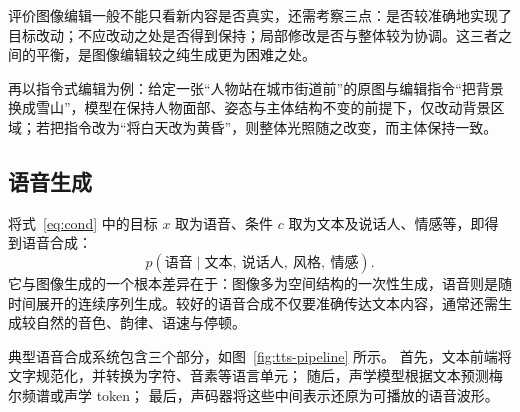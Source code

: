 \begin{importantnote}
  评价图像编辑一般不能只看新内容是否真实，还需考察三点：是否较准确地实现了目标改动；不应改动之处是否得到保持；局部修改是否与整体较为协调。这三者之间的平衡，是图像编辑较之纯生成更为困难之处。
\end{importantnote}

再以指令式编辑为例：给定一张“人物站在城市街道前”的原图与编辑指令“把背景换成雪山”，模型在保持人物面部、姿态与主体结构不变的前提下，仅改动背景区域；若把指令改为“将白天改为黄昏”，则整体光照随之改变，而主体保持一致。

\subsection{语音生成}
\label{sub:tts}

将式~\eqref{eq:cond} 中的目标 $x$ 取为语音、条件 $c$ 取为文本及说话人、情感等，即得到语音合成：
\begin{equation}
  p(\text{语音}\mid \text{文本},\ \text{说话人},\ \text{风格},\ \text{情感}).
\end{equation}
它与图像生成的一个根本差异在于：图像多为空间结构的一次性生成，语音则是随时间展开的连续序列生成。较好的语音合成不仅要准确传达文本内容，通常还需生成较自然的音色、韵律、语速与停顿。


典型语音合成系统包含三个部分，如图~\ref{fig:tts-pipeline} 所示。
首先，文本前端将文字规范化，并转换为字符、音素等语言单元；
随后，声学模型根据文本预测梅尔频谱或声学 token；
最后，声码器将这些中间表示还原为可播放的语音波形。

